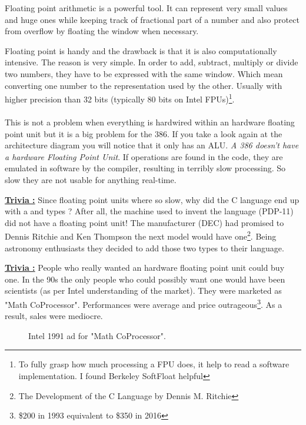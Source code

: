 \documentclass[book.tex]{subfiles}
\begin{document}
Floating point arithmetic is a powerful tool. It can represent very small values and huge ones while keeping track of fractional part of a number and also protect from overflow by floating the window when necessary.\\
\par
Floating point is handy and the drawback is that it is also computationally intensive. The reason is very simple. In order to add, subtract, multiply or divide two numbers, they have to be expressed with the same window. Which mean converting one number to the representation used by the other. Usually with higher precision than 32 bits (typically 80 bits on Intel FPUs)\footnote{To fully grasp how much processing a FPU does, it help to read a software implementation. I found Berkeley SoftFloat helpful}.\\
\\
This is not a problem when everything is hardwired within an hardware floating point unit but it is a big problem for the 386. If you take a look again at the architecture diagram you will notice that it only has an ALU. \emph{A 386 doesn't have a hardware Floating Point Unit}. If  operations are found in the code, they are emulated in software by the compiler, resulting in terribly slow processing. So slow they are not usable for anything real-time.\\ 
\par


 \textbf{\underline{Trivia :}} Since floating point units where so slow, why did the C language end up with a  and  types ? After all, the machine used to invent the language (PDP-11) did not have a floating point unit! The manufacturer (DEC) had promised to Dennis Ritchie and Ken Thompson the next model would have one\footnote{The Development of the C Language by Dennis M. Ritchie}. Being astronomy enthusiasts they decided to add those two types to their language.\\
\par


\textbf{\underline{Trivia :}} People who really wanted an hardware floating point unit could buy one. In the 90s the only people who could possibly want one would have been scientists (as per Intel understanding of the market). They were marketed as "Math CoProcessor". Performances were average and price outrageous\footnote{\$200 in 1993 equivalent to \$350 in 2016}. As a result, sales were mediocre.\\
\begin{figure}[H]
\centering
\caption{Intel 1991 ad for "Math CoProcessor".}
\label{fig:fp_internals}
\end{figure}
\end{document}
